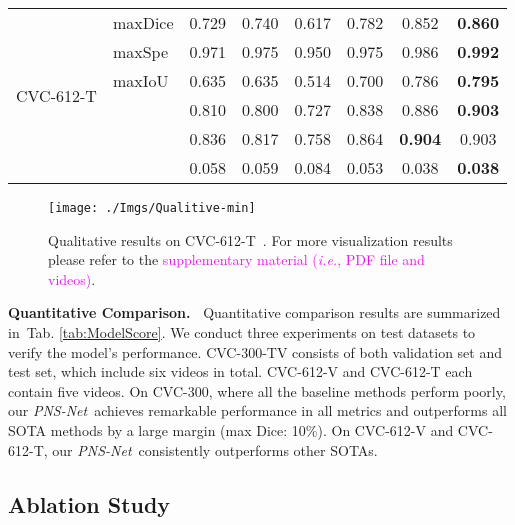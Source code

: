 \documentclass[runningheads]{llncs}
\newcommand{\tabref}[1]{Tab. \ref{#1}}
\newcommand{\supp}[1]{\textcolor{magenta}{#1}}
\def\ie{\emph{i.e.}}
\def\ourmodel{\textit{PNS-Net}}
\newcommand{\myPara}[1]{\noindent\textbf{#1~}}
\begin{document}
\begin{table}[t!]
\begin{tabular}{rl||ccc|cc|c}
\hline
\multirow{6}{*}{\begin{sideways}CVC-612-T\end{sideways}} 
& maxDice & 0.729   & 0.740   & 0.617   & 0.782   & 0.852   & \textbf{0.860}\\
& maxSpe & 0.971   & 0.975   & 0.950   & 0.975   & 0.986   & \textbf{0.992}\\
& maxIoU & 0.635   & 0.635   & 0.514   & 0.700   & 0.786   & \textbf{0.795}\\
&  & 0.810   & 0.800   & 0.727   & 0.838   & 0.886   & \textbf{0.903}\\
&  & 0.836   & 0.817   & 0.758   & 0.864   & \textbf{0.904}   & 0.903\\
&  & 0.058   & 0.059   & 0.084   & 0.053   & 0.038   & \textbf{0.038}\\
    \bottomrule
  \end{tabular}
\end{table}

\begin{figure}[t!]
  \centering
  \texttt{[image: ./Imgs/Qualitive-min]}
\caption{
  Qualitative results on CVC-612-T~\cite{bernal2015wm}. For more visualization results please refer to the \supp{supplementary material (\ie, PDF file and videos)}. 
}\label{fig:front_figure}
\end{figure}


\myPara{Quantitative Comparison.}
Quantitative comparison results are summarized in~\tabref{tab:ModelScore}.
We conduct three experiments on
 test datasets to verify the model's performance.
CVC-300-TV consists of both validation set and test set, which include six videos in total.
CVC-612-V and CVC-612-T each contain five videos.
On CVC-300, where all the baseline methods perform poorly, our \ourmodel~achieves remarkable performance in all metrics and outperforms all SOTA methods by a large margin (max Dice: 10\%).
On CVC-612-V and CVC-612-T, our \ourmodel~consistently outperforms other SOTAs.


\subsection{Ablation Study}\label{sec:ablation}
\end{document}
